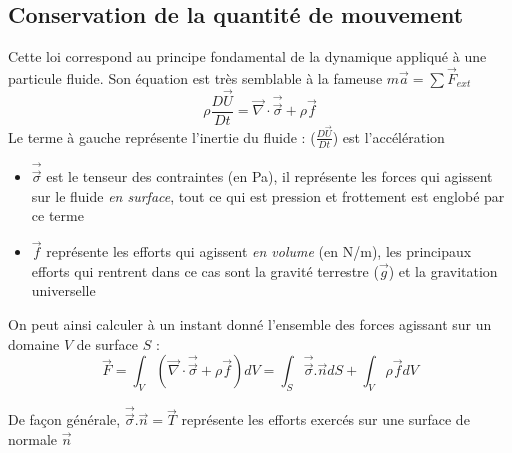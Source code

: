 \subsection{Conservation de la quantité de mouvement}
Cette loi correspond au principe fondamental de la dynamique appliqué à une particule fluide. Son équation est très semblable à la fameuse $m\vec{a}=\sum \vec{F}_{ext}$
%
\begin{equation}
\rho \frac{D\vec{U}}{Dt} = \vec{\nabla} \cdot \vec{\vec{\sigma}} + \rho \vec{f}
\label{eq:QDM}
\end{equation}
%
Le terme à gauche représente l'inertie du fluide : ($\frac{D\vec{U}}{Dt}$) est l'accélération

\begin{itemize}\renewcommand{\labelitemi}{$\bullet$}
\item $\vec{\vec{\sigma}}$ est le tenseur des contraintes (en Pa), il représente les forces qui agissent sur le fluide \textit{en surface}, tout ce qui est pression et frottement est englobé par ce terme

\item $\vec{f}$ représente les efforts qui agissent \textit{en volume} (en N/m), les principaux efforts qui rentrent dans ce cas sont la gravité terrestre ($\vec{g}$) et la gravitation universelle
\end{itemize}

On peut ainsi calculer à un instant donné l'ensemble des forces agissant sur un domaine $V$ de surface $S$ :
%
\begin{equation}
\vec{F} = \int_V { \left( \vec{\nabla} \cdot \vec{\vec{\sigma}} + \rho \vec{f} \right) dV }
        = \int_S { \vec{\vec{\sigma}}.\vec{n} dS} + \int_V {\rho \vec{f} dV }
\end{equation}

De façon générale, $\vec{\vec{\sigma}}.\vec{n} = \vec{T}$ représente les efforts exercés sur une surface de normale $\vec{n}$
